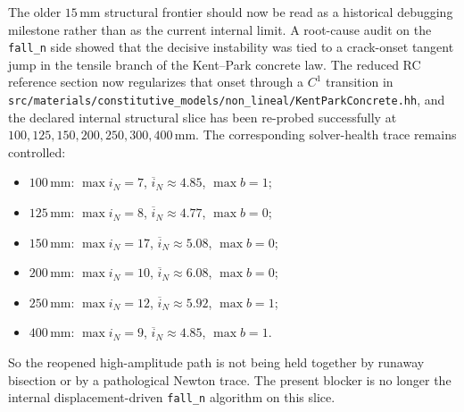 The older \(15\,\mathrm{mm}\) structural frontier should now be read as a
historical debugging milestone rather than as the current internal limit. A
root-cause audit on the \texttt{fall\_n} side showed that the decisive
instability was tied to a crack-onset tangent jump in the tensile branch of the
Kent--Park concrete law. The reduced RC reference section now regularizes that
onset through a \(C^1\) transition in
\texttt{src/materials/constitutive\_models/non\_lineal/KentParkConcrete.hh},
and the declared internal structural slice has been re-probed successfully at
\(100,125,150,200,250,300,400\,\mathrm{mm}\). The corresponding solver-health
trace remains controlled:
\begin{itemize}
  \item \(100\,\mathrm{mm}\): \(\max i_N = 7\),
    \(\overline{i}_N \approx 4.85\), \(\max b = 1\);
  \item \(125\,\mathrm{mm}\): \(\max i_N = 8\),
    \(\overline{i}_N \approx 4.77\), \(\max b = 0\);
  \item \(150\,\mathrm{mm}\): \(\max i_N = 17\),
    \(\overline{i}_N \approx 5.08\), \(\max b = 0\);
  \item \(200\,\mathrm{mm}\): \(\max i_N = 10\),
    \(\overline{i}_N \approx 6.08\), \(\max b = 0\);
  \item \(250\,\mathrm{mm}\): \(\max i_N = 12\),
    \(\overline{i}_N \approx 5.92\), \(\max b = 1\);
  \item \(400\,\mathrm{mm}\): \(\max i_N = 9\),
    \(\overline{i}_N \approx 4.85\), \(\max b = 1\).
\end{itemize}
So the reopened high-amplitude path is not being held together by runaway
bisection or by a pathological Newton trace. The present blocker is no longer
the internal displacement-driven \texttt{fall\_n} algorithm on this slice.

